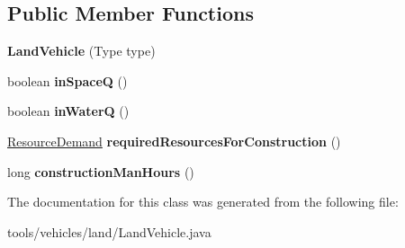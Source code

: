 \subsection*{Public Member Functions}
\begin{DoxyCompactItemize}
\item 
{\bfseries Land\+Vehicle} (Type type)\hypertarget{classtools_1_1vehicles_1_1land_1_1_land_vehicle_a08202a53925982f086659d8057505298}{}\label{classtools_1_1vehicles_1_1land_1_1_land_vehicle_a08202a53925982f086659d8057505298}

\item 
boolean {\bfseries in\+SpaceQ} ()\hypertarget{classtools_1_1vehicles_1_1land_1_1_land_vehicle_af88d4c2e74c529d1f4aa8dc6eee04066}{}\label{classtools_1_1vehicles_1_1land_1_1_land_vehicle_af88d4c2e74c529d1f4aa8dc6eee04066}

\item 
boolean {\bfseries in\+WaterQ} ()\hypertarget{classtools_1_1vehicles_1_1land_1_1_land_vehicle_ac69257ed9077f5c39bc498d79087de1c}{}\label{classtools_1_1vehicles_1_1land_1_1_land_vehicle_ac69257ed9077f5c39bc498d79087de1c}

\item 
\hyperlink{classuniverse_1_1_resource_demand}{Resource\+Demand} {\bfseries required\+Resources\+For\+Construction} ()\hypertarget{classtools_1_1vehicles_1_1land_1_1_land_vehicle_ac71d452af756f16ba89c117f2e8de2ab}{}\label{classtools_1_1vehicles_1_1land_1_1_land_vehicle_ac71d452af756f16ba89c117f2e8de2ab}

\item 
long {\bfseries construction\+Man\+Hours} ()\hypertarget{classtools_1_1vehicles_1_1land_1_1_land_vehicle_aaad9a8df73c0604f4a1fe68f583fa74f}{}\label{classtools_1_1vehicles_1_1land_1_1_land_vehicle_aaad9a8df73c0604f4a1fe68f583fa74f}

\end{DoxyCompactItemize}


The documentation for this class was generated from the following file\+:\begin{DoxyCompactItemize}
\item 
tools/vehicles/land/Land\+Vehicle.\+java\end{DoxyCompactItemize}
